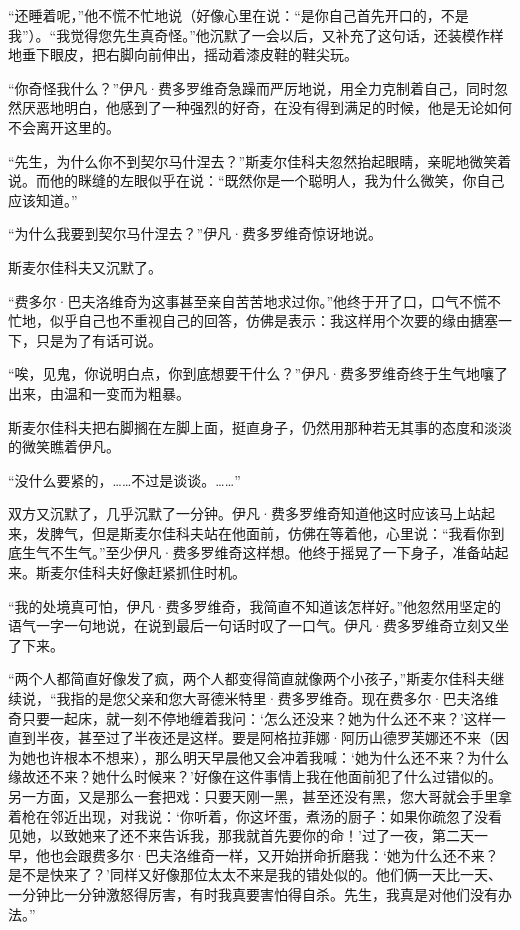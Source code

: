 \par “还睡着呢，”他不慌不忙地说（好像心里在说：“是你自己首先开口的，不是我”）。“我觉得您先生真奇怪。”他沉默了一会以后，又补充了这句话，还装模作样地垂下眼皮，把右脚向前伸出，摇动着漆皮鞋的鞋尖玩。
\par “你奇怪我什么？”伊凡·费多罗维奇急躁而严厉地说，用全力克制着自己，同时忽然厌恶地明白，他感到了一种强烈的好奇，在没有得到满足的时候，他是无论如何不会离开这里的。
\par “先生，为什么你不到契尔马什涅去？”斯麦尔佳科夫忽然抬起眼睛，亲昵地微笑着说。而他的眯缝的左眼似乎在说：“既然你是一个聪明人，我为什么微笑，你自己应该知道。”
\par “为什么我要到契尔马什涅去？”伊凡·费多罗维奇惊讶地说。
\par 斯麦尔佳科夫又沉默了。
\par “费多尔·巴夫洛维奇为这事甚至亲自苦苦地求过你。”他终于开了口，口气不慌不忙地，似乎自己也不重视自己的回答，仿佛是表示：我这样用个次要的缘由搪塞一下，只是为了有话可说。
\par “唉，见鬼，你说明白点，你到底想要干什么？”伊凡·费多罗维奇终于生气地嚷了出来，由温和一变而为粗暴。
\par 斯麦尔佳科夫把右脚搁在左脚上面，挺直身子，仍然用那种若无其事的态度和淡淡的微笑瞧着伊凡。
\par “没什么要紧的，……不过是谈谈。……”
\par 双方又沉默了，几乎沉默了一分钟。伊凡·费多罗维奇知道他这时应该马上站起来，发脾气，但是斯麦尔佳科夫站在他面前，仿佛在等着他，心里说：“我看你到底生气不生气。”至少伊凡·费多罗维奇这样想。他终于摇晃了一下身子，准备站起来。斯麦尔佳科夫好像赶紧抓住时机。
\par “我的处境真可怕，伊凡·费多罗维奇，我简直不知道该怎样好。”他忽然用坚定的语气一字一句地说，在说到最后一句话时叹了一口气。伊凡·费多罗维奇立刻又坐了下来。
\par “两个人都简直好像发了疯，两个人都变得简直就像两个小孩子，”斯麦尔佳科夫继续说，“我指的是您父亲和您大哥德米特里·费多罗维奇。现在费多尔·巴夫洛维奇只要一起床，就一刻不停地缠着我问：‘怎么还没来？她为什么还不来？’这样一直到半夜，甚至过了半夜还是这样。要是阿格拉菲娜·阿历山德罗芙娜还不来（因为她也许根本不想来），那么明天早晨他又会冲着我喊：‘她为什么还不来？为什么缘故还不来？她什么时候来？’好像在这件事情上我在他面前犯了什么过错似的。另一方面，又是那么一套把戏：只要天刚一黑，甚至还没有黑，您大哥就会手里拿着枪在邻近出现，对我说：‘你听着，你这坏蛋，煮汤的厨子：如果你疏忽了没看见她，以致她来了还不来告诉我，那我就首先要你的命！’过了一夜，第二天一早，他也会跟费多尔·巴夫洛维奇一样，又开始拼命折磨我：‘她为什么还不来？是不是快来了？’同样又好像那位太太不来是我的错处似的。他们俩一天比一天、一分钟比一分钟激怒得厉害，有时我真要害怕得自杀。先生，我真是对他们没有办法。”
